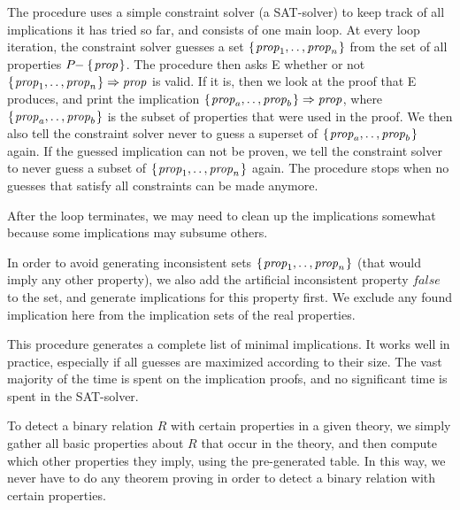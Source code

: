 \documentclass{article}
\newcommand{\Varid}[1]{\mathit{#1}}
\begin{document}
The procedure uses a simple constraint solver (a SAT-solver) to keep track of all implications it has tried so far, and consists of one main loop. At every loop iteration, the constraint solver guesses a set \ensuremath{\{\mskip1.5mu \Varid{prop}_1,\mathinner{\ldotp\ldotp},\Varid{prop}_n\mskip1.5mu\}} from the set of all properties \ensuremath{P\hspace{-0.1cm}\mathbin{-}\{\mskip1.5mu \Varid{prop}\mskip1.5mu\}}. The procedure then asks E whether or not \ensuremath{\{\mskip1.5mu \Varid{prop}_1,\mathinner{\ldotp\ldotp},\Varid{prop}_n\mskip1.5mu\}\Rightarrow \Varid{prop}} is valid. If it is, then we look at the proof that E produces, and print the implication \ensuremath{\{\mskip1.5mu \Varid{prop}_a,\mathinner{\ldotp\ldotp},\Varid{prop}_b\mskip1.5mu\}\Rightarrow \Varid{prop}}, where \ensuremath{\{\mskip1.5mu \Varid{prop}_a,\mathinner{\ldotp\ldotp},\Varid{prop}_b\mskip1.5mu\}} is the subset of properties that were used in the proof. We then also tell the constraint solver never to guess a superset of \ensuremath{\{\mskip1.5mu \Varid{prop}_a,\mathinner{\ldotp\ldotp},\Varid{prop}_b\mskip1.5mu\}} again. If the guessed implication can not be proven, we tell the constraint solver to never guess a subset of \ensuremath{\{\mskip1.5mu \Varid{prop}_1,\mathinner{\ldotp\ldotp},\Varid{prop}_n\mskip1.5mu\}} again. The procedure stops when no guesses that satisfy all constraints can be made anymore.

After the loop terminates, we may need to clean up the implications somewhat because some implications may subsume others.

In order to avoid generating inconsistent sets \ensuremath{\{\mskip1.5mu \Varid{prop}_1,\mathinner{\ldotp\ldotp},\Varid{prop}_n\mskip1.5mu\}} (that would imply any other property), we also add the artificial inconsistent property \ensuremath{\Varid{false}} to the set, and generate implications for this property first. We exclude any found implication here from the implication sets of the real properties. 

This procedure generates a complete list of minimal implications. It works well in practice, especially if all guesses are maximized according to their size. The vast majority of the time is spent on the implication proofs, and no significant time is spent in the SAT-solver.

To detect a binary relation \ensuremath{R} with certain properties in a given theory, we simply gather all basic properties about \ensuremath{R} that occur in the theory, and then compute which other properties they imply, using the pre-generated table. In this way, we never have to do any theorem proving in order to detect a binary relation with certain properties.
\end{document}
